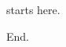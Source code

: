 \documentclass{article}
\begin{document}
\hphantom{X} starts here.

\hphantom{Y}

End.
\end{document}

